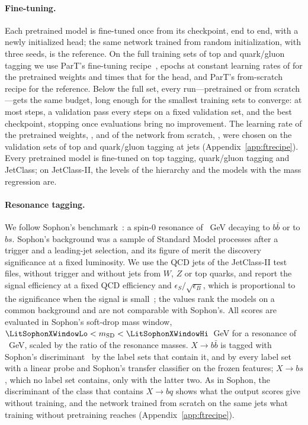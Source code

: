 \documentclass[11pt]{article}
\begin{document}
\paragraph{Fine-tuning.} Each pretrained model is fine-tuned once from its checkpoint, end to end,
with a newly initialized head; the same network trained from random initialization, with three
seeds, is the reference. On the full training sets of top and quark/gluon tagging we use ParT's
fine-tuning recipe~\cite[Sec.~5.2]{part}, \LitPartFtEpochs{} epochs at constant learning rates of \MlstFtLr{}
for the pretrained weights and \FtHeadMult{} times that for the head, and ParT's from-scratch recipe for
the reference.
Below the full set, every run---pretrained or from scratch---gets the same budget, long enough for
the smallest training sets to converge: at most
\FtBudgetSteps{} steps, a validation pass every \FtBudgetEval{} steps on a fixed validation set, and
the best checkpoint, stopping once \FtBudgetPatience{} evaluations bring no improvement. The
learning rate of the pretrained weights, \FtLrPre, and of the network from scratch, \FtLrScratch,
were chosen on the validation sets of top and quark/gluon tagging at \FtSizeEFour{} jets
(Appendix~\ref{app:ftrecipe}). Every pretrained model is fine-tuned on top tagging, quark/gluon
tagging and JetClass; on JetClass-II, the levels of the hierarchy and the models with the mass
regression are.

\paragraph{Resonance tagging.}\label{sec:xbb} We follow Sophon's benchmark~\cite[Sec.~III]{sophon}: a
spin-0 resonance of \XbxMx~GeV decaying to $b\bar b$ or to $bs$.
Sophon's background was a sample of Standard Model processes after a trigger and a leading-jet
selection, and its figure of merit the discovery significance at a fixed luminosity. We use the QCD
jets of the JetClass-II test files, without trigger and without jets from $W$, $Z$ or top quarks,
and report the signal efficiency at a fixed QCD efficiency and $\epsilon_S/\sqrt{\epsilon_B}$, which
is proportional to the significance when the signal is small~\cite{cowan}; the values rank the
models on a common background and are not comparable with Sophon's. All scores are evaluated in
Sophon's soft-drop mass window, $\LitSophonXWindowLo < m_{\mathrm{SD}} < \LitSophonXWindowHi$~GeV for
a resonance of \LitSophonXMass~GeV, scaled by the ratio of the resonance masses. $X\to b\bar b$ is
tagged with Sophon's discriminant~\cite[Eq.~(4)]{sophon} by the label sets that contain it, and by
every label set with a linear probe and Sophon's transfer classifier on the frozen features;
$X\to bs$, which no label set contains, only with the latter two. As in Sophon, the discriminant of
the class that contains $X\to bq$ shows what the output scores give without training, and the network
trained from scratch on the same jets what training without pretraining reaches
(Appendix~\ref{app:ftrecipe}).
\end{document}
